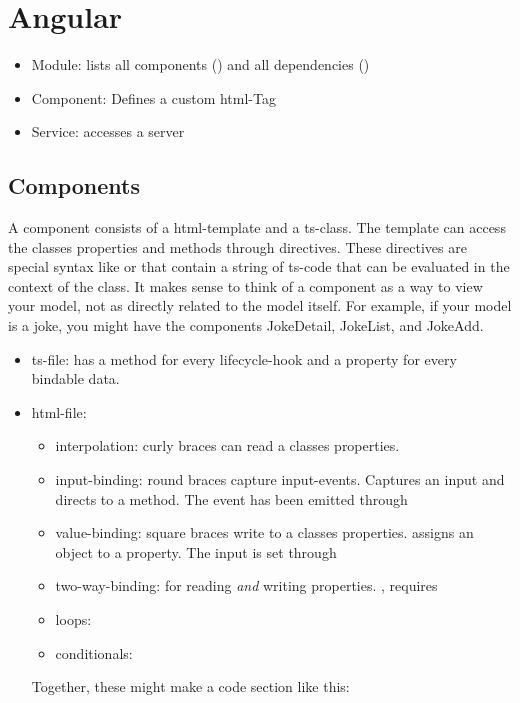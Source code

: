 \section{Angular}

\begin{itemize}
    \item Module: lists all components () and all dependencies ()
    \item Component: Defines a custom html-Tag
    \item Service: accesses a server
\end{itemize}

\subsection{Components}

A component consists of a html-template and a ts-class. The template can access the classes properties and methods through directives.
These directives are special syntax like \inlinecode{\{\}} or  that contain a string of ts-code that can be evaluated in the context of the class.
It makes sense to think of a component as a way to view your model, not as directly related to the model itself. For example, if your model is a joke, you might have the components JokeDetail, JokeList, and JokeAdd.

\begin{itemize}
    \item ts-file: has a method for every lifecycle-hook and a property for every bindable data.
    \item html-file:
            \begin{itemize}
                \item interpolation: curly braces can read a classes properties. 
                \item input-binding: round braces capture input-events.  Captures an input and directs to a method. The event has been emitted through 
                \item value-binding: square braces write to a classes properties.  assigns an object to a property. The input is set through 
                \item two-way-binding: for reading \emph{and} writing properties. , requires 
                \item loops: 
                \item conditionals: 
            \end{itemize}
            Together, these might make a code section like this: 
\end{itemize}

